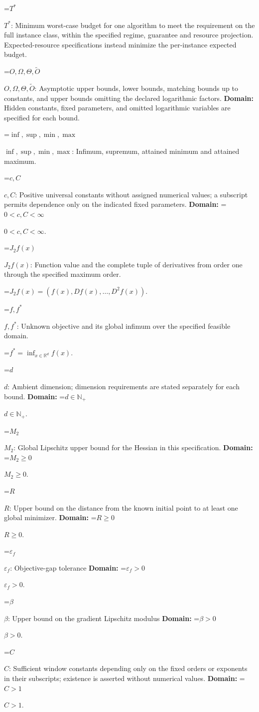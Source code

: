 \documentclass[10pt,a4paper]{article}
\newcommand{\AtlasMath}[1]{\par\begingroup\centering\setbox0=\hbox{$\displaystyle #1$}\ifdim\wd0>1.4\linewidth\typeout{ATLAS WIDE FORMULA: \the\wd0}\fi\ifdim\wd0>\linewidth\resizebox{\linewidth}{!}{\box0}\else\box0\fi\par\endgroup}
\newcommand{\AtlasInlineMath}[1]{\begingroup\setbox0=\hbox{$#1$}\ifdim\wd0>.4\linewidth\endgroup\AtlasMath{#1}\else\endgroup$#1$\fi}
\begin{document}
\AtlasInlineMath{T^*}: Minimum worst-case budget for one algorithm to meet the requirement on the full instance class, within the specified regime, guarantee and resource projection. Expected-resource specifications instead minimize the per-instance expected budget.

\AtlasInlineMath{O,\Omega,\Theta,\widetilde{O}}: Asymptotic upper bounds, lower bounds, matching bounds up to constants, and upper bounds omitting the declared logarithmic factors. \textbf{Domain:} Hidden constants, fixed parameters, and omitted logarithmic variables are specified for each bound.

\AtlasInlineMath{\inf,\sup,\min,\max}: Infimum, supremum, attained minimum and attained maximum.

\AtlasInlineMath{c,C}: Positive universal constants without assigned numerical values; a subscript permits dependence only on the indicated fixed parameters. \textbf{Domain:} \AtlasInlineMath{0<c,C<\infty}.

\AtlasInlineMath{J_{2}f(x)}: Function value and the complete tuple of derivatives from order one through the specified maximum order.


\AtlasMath{J_{2}f(x)=(f(x),Df(x),\ldots,D^{2}f(x)).}


\AtlasInlineMath{f,f^*}: Unknown objective and its global infimum over the specified feasible domain.


\AtlasMath{f^*=\inf_{x\in \mathbb{R}^d}f(x).}


\AtlasInlineMath{d}: Ambient dimension; dimension requirements are stated separately for each bound. \textbf{Domain:} \AtlasInlineMath{d\in\mathbb{N}_{+}}.

\AtlasInlineMath{M_2}: Global Lipschitz upper bound for the Hessian in this specification. \textbf{Domain:} \AtlasInlineMath{M_2\ge0}.

\AtlasInlineMath{R}: Upper bound on the distance from the known initial point to at least one global minimizer. \textbf{Domain:} \AtlasInlineMath{R\ge0}.

\AtlasInlineMath{\varepsilon_f}: Objective-gap tolerance \textbf{Domain:} \AtlasInlineMath{\varepsilon_f>0}.

\AtlasInlineMath{\beta}: Upper bound on the gradient Lipschitz modulus \textbf{Domain:} \AtlasInlineMath{\beta>0}.

\AtlasInlineMath{C}: Sufficient window constants depending only on the fixed orders or exponents in their subscripts; existence is asserted without numerical values. \textbf{Domain:} \AtlasInlineMath{C>1}.
\end{document}
